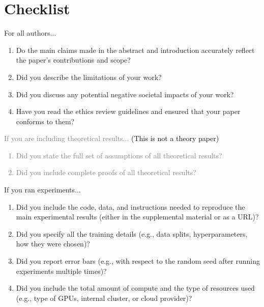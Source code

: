 \documentclass{article}
\begin{document}
{\small


}

\iffalse
\newpage
\section*{Checklist}
\begin{enumerate}
\item For all authors...
\begin{enumerate}
  \item Do the main claims made in the abstract and introduction accurately reflect the paper's contributions and scope?
  \item Did you describe the limitations of your work?
  \item Did you discuss any potential negative societal impacts of your work?
  \item Have you read the ethics review guidelines and ensured that your paper conforms to them?
    \answerYes{}
\end{enumerate}


\textcolor{gray}{
\item If you are including theoretical results...
\textcolor{black}{(This is not a theory paper)}
\begin{enumerate}
  \item Did you state the full set of assumptions of all theoretical results?
    \answerNA{}
  \item Did you include complete proofs of all theoretical results?
    \answerNA{}
\end{enumerate}
}


\item If you ran experiments...
\begin{enumerate}
  \item Did you include the code, data, and instructions needed to
    reproduce the main experimental results (either in the supplemental
    material or as a URL)?
    \answerYes{}
  \item Did you specify all the training details (e.g., data splits,
    hyperparameters, how they were chosen)?
    \answerYes{}
  \item Did you report error bars (e.g., with respect to the random seed after running experiments multiple times)?
  \item Did you include the total amount of compute and the type of
    resources used (e.g., type of GPUs, internal cluster, or cloud provider)?
    \answerYes{}
\end{enumerate}


\end{enumerate}
\end{document}
